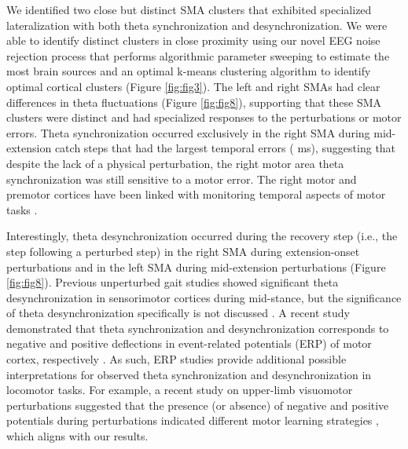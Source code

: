 \documentclass[../thesis_seyed.tex]{subfiles}
\begin{document}
We identified two close but distinct SMA clusters that exhibited specialized lateralization with both theta synchronization and desynchronization. We were able to identify distinct clusters in close proximity using our novel EEG noise rejection process that performs algorithmic parameter sweeping to estimate the most brain sources and an optimal k-means clustering algorithm to identify optimal cortical clusters (Figure \ref{fig:fig3}). The left and right SMAs had clear differences in theta fluctuations (Figure \ref{fig:fig8}), supporting that these SMA clusters were distinct and had specialized responses to the perturbations or motor errors. Theta synchronization occurred exclusively in the right SMA during mid-extension catch steps that had the largest temporal errors ( ms), suggesting that despite the lack of a physical perturbation, the right motor area theta synchronization was still sensitive to a motor error. The right motor and premotor cortices have been linked with monitoring temporal aspects of motor tasks \cite{Mutha2014-ea,Wagner2016-nx}.

Interestingly, theta desynchronization occurred during the recovery step (i.e., the step following a perturbed step) in the right SMA during extension-onset perturbations and in the left SMA during mid-extension perturbations (Figure \ref{fig:fig8}). Previous unperturbed gait studies showed significant theta desynchronization in sensorimotor cortices during mid-stance, but the significance of theta desynchronization specifically is not discussed \cite{Gramann2011-yj,Bulea2015-dv,Enders2016-id,Kline2016-ci}. A recent study demonstrated that theta synchronization and desynchronization corresponds to negative and positive deflections in event-related potentials (ERP) of motor cortex, respectively \cite{Nakagome2020-iv}. As such, ERP studies provide additional possible interpretations for observed theta synchronization and desynchronization in locomotor tasks. For example, a recent study on upper-limb visuomotor perturbations suggested that the presence (or absence) of negative and positive potentials during perturbations indicated different motor learning strategies \cite{Palidis2019-kg}, which aligns with our results.
\end{document}
